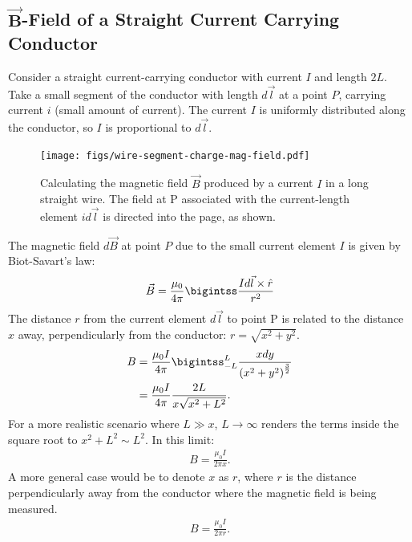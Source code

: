 \documentclass[12pt,b4paper]{article}
\begin{document}
\subsection{$\boldsymbol{\vec{B}}$-Field of a Straight Current Carrying Conductor}
Consider a straight current-carrying conductor with current $I$ and length $2L$. Take a small segment of the conductor with length $d\vec{l}$ at a point $P$, carrying current $i$ (small amount of current). The current $I$ is uniformly distributed along the conductor, so $I$ is proportional to $d\vec{l}$. 
\begin{figure}[H]
    \centering
    \texttt{[image: figs/wire-segment-charge-mag-field.pdf]}
    \caption{Calculating the magnetic field $\vec{B}$ produced by a current $I$ in a long straight wire. The field at P associated with the current-length element $id\vec{l}$ is directed into the page, as shown.}
    \label{fig:wire-segment-charge-mag-field}
\end{figure}
The magnetic field $d\vec{B}$ at point $P$ due to the small current element $I$ is given by Biot-Savart's law:
\begin{align}
    \vec{B}=\frac{\mu_0}{4\pi}\bigintss\frac{Id\vec{l}\times\hat{r}}{r^2}
\end{align}
The distance $r$ from the current element $d\vec{l}$ to point P is related to the distance $x$ away, perpendicularly from the conductor: $r=\sqrt{x^2+y^2}$.
\begin{align}
    B&=\frac{\mu_0I}{4\pi}\bigintss_{-L}^L\frac{xdy}{\left(x^2+y^2\right)^{\frac{3}{2}}}\notag\\
    &=\frac{\mu_0I}{4\pi}\frac{2L}{x\sqrt{x^2+L^2}}.
\end{align}
For a more realistic scenario where $L\gg x$, $L\to\infty$ renders the terms inside the square root to $x^2+L^2\sim L^2$. In this limit:
\begin{align}
    B=\frac{\mu_0I}{2\pi x}.
\end{align}
A more general case would be to denote $x$ as $r$, where $r$ is the distance perpendicularly away from the conductor where the magnetic field is being measured.
\begin{align}
    B=\frac{\mu_0I}{2\pi r}.
\end{align}
\end{document}
